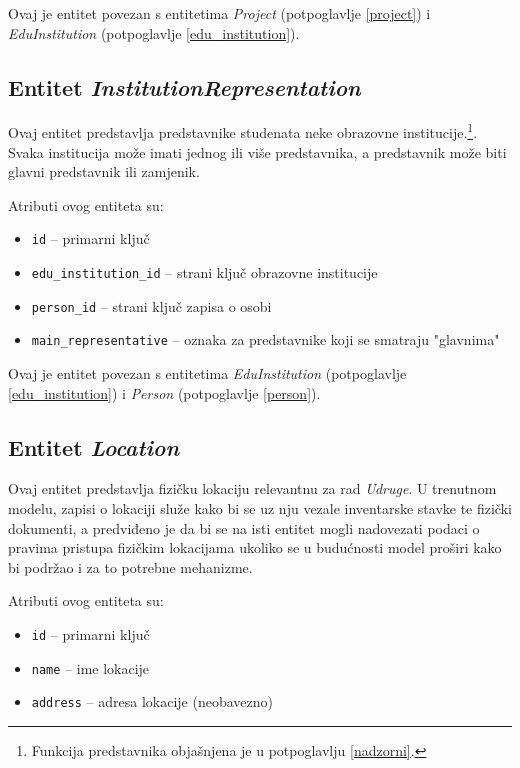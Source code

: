 \documentclass[times, utf8, diplomski]{fer}
\begin{document}
Ovaj je entitet povezan s entitetima \emph{Project} (potpoglavlje \ref{project})
i \emph{EduInstitution} (potpoglavlje \ref{edu_institution}).

\subsection{Entitet \emph{InstitutionRepresentation}}
\label{institution_representation}

Ovaj entitet predstavlja predstavnike studenata neke obrazovne
institucije.\footnote{Funkcija predstavnika objašnjena je u potpoglavlju
    \ref{nadzorni}.}. Svaka institucija može imati jednog ili više predstavnika,
    a predstavnik može biti glavni predstavnik ili zamjenik.


\medskip
Atributi ovog entiteta su:
\begin{itemize}
    \item \texttt{id} -- primarni ključ
    \item \texttt{edu\_institution\_id} -- strani ključ obrazovne institucije
    \item \texttt{person\_id} -- strani ključ zapisa o osobi
    \item \texttt{main\_representative} -- oznaka za predstavnike koji se
        smatraju "glavnima"
\end{itemize}

Ovaj je entitet povezan s entitetima \emph{EduInstitution} (potpoglavlje
\ref{edu_institution}) i \emph{Person} (potpoglavlje \ref{person}).

\subsection{Entitet \emph{Location}} \label{location}

Ovaj entitet predstavlja fizičku lokaciju relevantnu za rad \emph{Udruge}. U
trenutnom modelu, zapisi o lokaciji služe kako bi se uz nju vezale inventarske
stavke te fizički dokumenti, a predviđeno je da bi se na isti entitet mogli
nadovezati podaci o pravima pristupa fizičkim lokacijama ukoliko se u budućnosti
model proširi kako bi podržao i za to potrebne mehanizme.

\medskip
Atributi ovog entiteta su:
\begin{itemize}
    \item \texttt{id} -- primarni ključ
    \item \texttt{name} -- ime lokacije
    \item \texttt{address} -- adresa lokacije (neobavezno)
\end{itemize}
\end{document}
